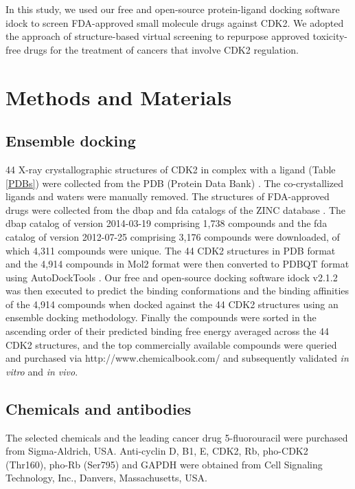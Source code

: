 \documentclass[10pt]{article}
\begin{document}
In this study, we used our free and open-source protein-ligand docking software idock \cite{1153,1362} to screen FDA-approved small molecule drugs against CDK2. We adopted the approach of structure-based virtual screening to repurpose approved toxicity-free drugs for the treatment of cancers that involve CDK2 regulation.

\section*{Methods and Materials}

\subsection*{Ensemble docking}

44 X-ray crystallographic structures of CDK2 in complex with a ligand (Table \ref{PDBs}) were collected from the PDB (Protein Data Bank) \cite{540,537}. The co-crystallized ligands and waters were manually removed. The structures of FDA-approved drugs were collected from the dbap and fda catalogs of the ZINC database \cite{532,1178}. The dbap catalog of version 2014-03-19 comprising 1,738 compounds and the fda catalog of version 2012-07-25 comprising 3,176 compounds were downloaded, of which 4,311 compounds were unique. The 44 CDK2 structures in PDB format and the 4,914 compounds in Mol2 format were then converted to PDBQT format using AutoDockTools \cite{596}. Our free and open-source docking software idock v2.1.2 \cite{1153,1362} was then executed to predict the binding conformations and the binding affinities of the 4,914 compounds when docked against the 44 CDK2 structures using an ensemble docking methodology. Finally the compounds were sorted in the ascending order of their predicted binding free energy averaged across the 44 CDK2 structures, and the top commercially available compounds were queried and purchased via http://www.chemicalbook.com/ and subsequently validated \textit{in vitro} and \textit{in vivo}.

\subsection*{Chemicals and antibodies}

The selected chemicals and the leading cancer drug 5-fluorouracil were purchased from Sigma-Aldrich, USA. Anti-cyclin D, B1, E, CDK2, Rb, pho-CDK2 (Thr160), pho-Rb (Ser795) and GAPDH were obtained from Cell Signaling Technology, Inc., Danvers, Massachusetts, USA.
\end{document}
